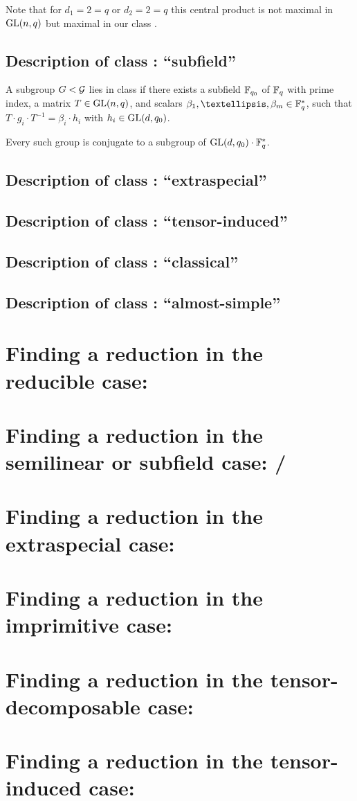 Note that for $d_1=2=q$ or $d_2 = 2 = q$ this central product is not 
maximal in $\GL(n,q)$ but maximal in our class .

\subsection{Description of class : ``subfield''}
\label{descC5}

\desc
A subgroup $G < \mathcal{G}$ lies in class  if there exists a subfield 
$\mathbb{F}_{q_0}$ of $\mathbb{F}_q$ with prime index, a matrix $T \in \GL(n,q)$, and 
scalars $\beta_1, \ldots, \beta_m
\in \F_q^*$, such that $T \cdot g_i \cdot T^{-1} = \beta_i \cdot h_i$ with
$h_i \in \GL(d,q_0)$.

\stru
Every such group is conjugate to a subgroup of $\GL(d,q_0) \cdot \F_q^*$.

\subsection{Description of class : ``extraspecial''}
\label{descC6}

\subsection{Description of class : ``tensor-induced''}
\label{descC7}

\subsection{Description of class : ``classical''}
\label{descC8}

\subsection{Description of class : ``almost-simple''}
\label{descC9}

\section{Finding a reduction in the reducible case: }
\label{solveC1}

\section{Finding a reduction in the semilinear or subfield case: /}
\label{solveC3C5}

\section{Finding a reduction in the extraspecial case: }
\label{solveC6}

\section{Finding a reduction in the imprimitive case: }
\label{solveC2}

\section{Finding a reduction in the tensor-decomposable case: }
\label{solveC4}

\section{Finding a reduction in the tensor-induced case: }
\label{solveC7}



